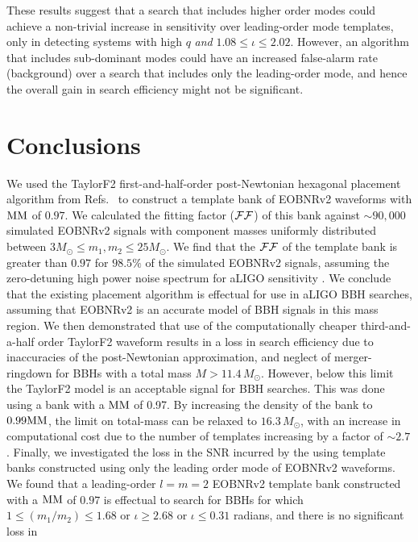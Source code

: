 These results suggest that a search that includes higher order modes
could achieve a non-trivial increase in sensitivity over leading-order mode
templates, only in detecting systems with high $q$ \textit{and} $1.08\leq\iota\leq 2.02$.  
However, an algorithm that includes sub-dominant modes could have an 
increased false-alarm rate (background) over a search that includes 
only the leading-order mode, and hence the overall gain in search efficiency
might not be significant. 

\section{Conclusions}
\label{s:conclusions}

We used the TaylorF2 first-and-half-order post-Newtonian hexagonal placement algorithm
from Refs.~\cite{SathyaMetric2PN,BabaketalBankPlacement,Cokelaer:2007kx} to construct a
template bank of EOBNRv2 waveforms with $\mathrm{MM}$ of $0.97$. We calculated the
fitting factor ($\mathcal{FF}$) of this bank against $\sim 90,000$ simulated EOBNRv2
signals with component masses uniformly distributed between $3 M_{\odot} \le
m_1,m_2 \le 25 M_{\odot}$. We find that the $\mathcal{FF}$ of the template bank is
greater than $0.97$ for $98.5\%$ of the simulated EOBNRv2 signals, assuming
the zero-detuning high power noise spectrum for aLIGO sensitivity
\cite{aLIGONoiseCurve}. We conclude that the existing placement algorithm is
effectual for use in aLIGO BBH searches, assuming that EOBNRv2 is an accurate
model of BBH signals in this mass region.  We then demonstrated that use of the
computationally cheaper third-and-a-half order TaylorF2 waveform results in a
loss in search efficiency due to inaccuracies of the post-Newtonian
approximation, and neglect of merger-ringdown for BBHs with a total mass $M >
11.4\,M_{\odot}$. However, below this limit the TaylorF2 model is an acceptable
signal for BBH searches. This was done using a bank with a $\mathrm{MM}$ of 0.97. By 
increasing the density of the bank to $0.99\mathrm{MM}$, the limit on total-mass can be 
relaxed to $16.3\,M_{\odot}$, with an increase in computational cost due to the 
number of templates increasing by a factor of $\sim 2.7$. Finally, we investigated 
the loss in the SNR incurred by the using template banks constructed using 
only the leading order mode of EOBNRv2 waveforms.  We found that a leading-order 
$l=m=2$ EOBNRv2 template bank constructed with a $\mathrm{MM}$ of $0.97$ is effectual 
to search for BBHs for which $1\leq \left(m_1/m_2\right)\leq 1.68$ or $\iota \geq 2.68$ 
or $\iota\leq 0.31$ radians, and there is no significant loss in
